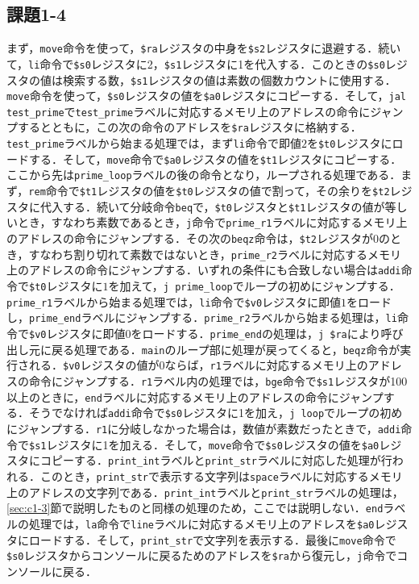 \subsection{課題1-4} \label{sec:c1-4}
まず，\verb|move|命令を使って，\verb|$ra|レジスタの中身を\verb|$s2|レジスタに退避する．続いて，\verb|li|命令で\verb|$s0|レジスタに2，\verb|$s1|レジスタに1を代入する．このときの\verb|$s0|レジスタの値は検索する数，\verb|$s1|レジスタの値は素数の個数カウントに使用する．\verb|move|命令を使って，\verb|$s0|レジスタの値を\verb|$a0|レジスタにコピーする．そして，\verb|jal test_prime|で\verb|test_prime|ラベルに対応するメモリ上のアドレスの命令にジャンプするとともに，この次の命令のアドレスを\verb|$ra|レジスタに格納する．\verb|test_prime|ラベルから始まる処理では，まず\verb|li|命令で即値$2$を\verb|$t0|レジスタにロードする．そして，\verb|move|命令で\verb|$a0|レジスタの値を\verb|$t1|レジスタにコピーする．ここから先は\verb|prime_loop|ラベルの後の命令となり，ループされる処理である．まず，\verb|rem|命令で\verb|$t1|レジスタの値を\verb|$t0|レジスタの値で割って，その余りを\verb|$t2|レジスタに代入する．続いて分岐命令\verb|beq|で，\verb|$t0|レジスタと\verb|$t1|レジスタの値が等しいとき，すなわち素数であるとき，\verb|j|命令で\verb|prime_r1|ラベルに対応するメモリ上のアドレスの命令にジャンプする．その次の\verb|beqz|命令は，\verb|$t2|レジスタが$0$のとき，すなわち割り切れて素数ではないとき，\verb|prime_r2|ラベルに対応するメモリ上のアドレスの命令にジャンプする．いずれの条件にも合致しない場合は\verb|addi|命令で\verb|$t0|レジスタに$1$を加えて，\verb|j prime_loop|でループの初めにジャンプする．\verb|prime_r1|ラベルから始まる処理では，\verb|li|命令で\verb|$v0|レジスタに即値$1$をロードし，\verb|prime_end|ラベルにジャンプする．\verb|prime_r2|ラベルから始まる処理は，\verb|li|命令で\verb|$v0|レジスタに即値0をロードする．\verb|prime_end|の処理は，\verb|j $ra|により呼び出し元に戻る処理である．\verb|main|のループ部に処理が戻ってくると，\verb|beqz|命令が実行される．\verb|$v0|レジスタの値が$0$ならば，\verb|r1|ラベルに対応するメモリ上のアドレスの命令にジャンプする．\verb|r1|ラベル内の処理では，\verb|bge|命令で\verb|$s1|レジスタが100以上のときに，\verb|end|ラベルに対応するメモリ上のアドレスの命令にジャンプする．そうでなければ\verb|addi|命令で\verb|$s0|レジスタに1を加え，\verb|j loop|でループの初めにジャンプする．\verb|r1|に分岐しなかった場合は，数値が素数だったときで，\verb|addi|命令で\verb|$s1|レジスタに1を加える．そして，\verb|move|命令で\verb|$s0|レジスタの値を\verb|$a0|レジスタにコピーする．\verb|print_int|ラベルと\verb|print_str|ラベルに対応した処理が行われる．このとき，\verb|print_str|で表示する文字列は\verb|space|ラベルに対応するメモリ上のアドレスの文字列である．\verb|print_int|ラベルと\verb|print_str|ラベルの処理は，\ref{sec:c1-3}節で説明したものと同様の処理のため，ここでは説明しない．\verb|end|ラベルの処理では，\verb|la|命令で\verb|line|ラベルに対応するメモリ上のアドレスを\verb|$a0|レジスタにロードする．そして，\verb|print_str|で文字列を表示する．最後に\verb|move|命令で\verb|$s0|レジスタからコンソールに戻るためのアドレスを\verb|$ra|から復元し，\verb|j|命令でコンソールに戻る．

